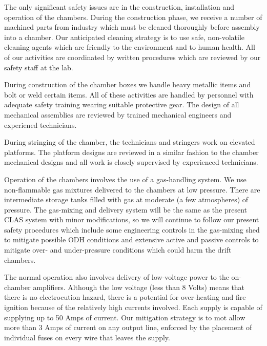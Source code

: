 The only significant safety issues are in the construction, installation and
operation of the chambers.  During the construction phase, we receive a number of
machined parts from industry which must be cleaned thoroughly before assembly into
a chamber.  Our anticipated cleaning strategy is to use safe, non-volatile cleaning
agents which are friendly to the environment and to human health.  All of our
activities are coordinated by written procedures which are reviewed by our safety
staff at the lab.

During construction of the chamber boxes we handle heavy metallic items and bolt
or weld certain items.  All of these activities are handled by personnel with
adequate safety training wearing suitable protective gear.  The design of all
mechanical assemblies are reviewed by trained mechanical engineers and experiened
technicians.

During stringing of the chamber, the technicians and stringers work on elevated
platforms.  The platform designs are reviewed in a similar fashion to the 
chamber mechanical designs and all work is closely supervised by experienced 
technicians.

Operation of the chambers involves the use of a gas-handling system.  We use non-flammable
gas mixtures delivered to the chambers at low pressure.  There are intermediate 
storage tanks filled with gas at moderate (a few atmospheres) of pressure.  The 
gas-mixing and delivery system will be the same as the present CLAS system with minor
modifications, so we will continue to follow our present safety procedures which
include some engineering controls in the gas-mixing shed to mitigate possible
ODH conditions and extensive active and passive controls to mitigate over- and
under-pressure conditions which could harm the drift chambers.


The normal operation also involves delivery of low-voltage power to the on-chamber
amplifiers.  Although the low voltage (less than 8 Volts) means that there is no
electrocution hazard, there is a potential for over-heating and fire ignition because
of the relatively high currents involved.  Each supply is capable of supplying up
to 50 Amps of current.  Our mitigation strategy is to mot allow more than 3 Amps
of current on any output line, enforced by the placement of individual fuses on
every wire that leaves the supply. 

